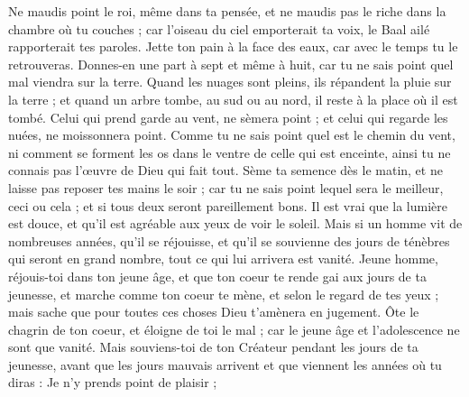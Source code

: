 \begin{multicols}{2}
Ne maudis point le roi, même dans ta pensée, et ne maudis pas le riche dans la chambre où tu couches ; car l'oiseau du ciel emporterait ta voix, le Baal ailé rapporterait tes paroles.
\VerseOne{}Jette ton pain à la face des eaux, car avec le temps tu le retrouveras.
Donnes-en une part à sept et même à huit, car tu ne sais point quel mal viendra sur la terre.
Quand les nuages sont pleins, ils répandent la pluie sur la terre ; et quand un arbre tombe, au sud ou au nord, il reste à la place où il est tombé.
Celui qui prend garde au vent, ne sèmera point ; et celui qui regarde les nuées, ne moissonnera point. 
Comme tu ne sais point quel est le chemin du vent, ni comment se forment les os dans le ventre de celle qui est enceinte, ainsi tu ne connais pas l'œuvre de Dieu qui fait tout.
 Sème ta semence dès le matin, et ne laisse pas reposer tes mains le soir ; car tu ne sais point lequel sera le meilleur, ceci ou cela ; et si tous deux seront pareillement bons.
Il est vrai que la lumière est douce, et qu'il est agréable aux yeux de voir le soleil.
Mais si un homme vit de nombreuses années, qu'il se réjouisse, et qu'il se souvienne des jours de ténèbres qui seront en grand nombre, tout ce qui lui arrivera est vanité.
\VerseOne{}Jeune homme, réjouis-toi dans ton jeune âge, et que ton coeur te rende gai aux jours de ta jeunesse, et marche comme ton coeur te mène, et selon le regard de tes yeux ; mais sache que pour toutes ces choses Dieu t'amènera en jugement. 
Ôte le chagrin de ton coeur, et éloigne de toi le mal ; car le jeune âge et l'adolescence ne sont que vanité. 
Mais souviens-toi de ton Créateur pendant les jours de ta jeunesse, avant que les jours mauvais arrivent et que viennent les années où tu diras : Je n'y prends point de plaisir ;

\end{multicols}
